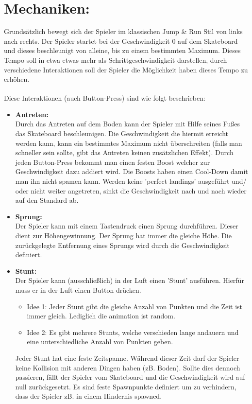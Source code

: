 \documentclass[paper=a4,fontsize=12pt,ngerman]{scrartcl}
\begin{document}
\section*{Mechaniken:}
Grundsätzlich bewegt sich der Spieler im klassischen Jump \& Run Stil von links nach rechts.
Der Spieler startet bei der Geschwindigkeit 0 auf dem Skateboard und dieses beschleunigt
von alleine, bis zu einem bestimmten Maximum.
Dieses Tempo soll in etwa etwas mehr als Schrittgeschwindigkeit darstellen, durch
verschiedene Interaktionen soll der Spieler die Möglichkeit haben dieses Tempo zu erhöhen.
\\ \\
Diese Interaktionen (auch Button-Press) sind wie folgt beschrieben:
\begin{itemize}
	\item \textbf{Antreten:} \\ Durch das Antreten auf dem Boden kann der Spieler mit Hilfe seines Fußes das Skateboard
	beschleunigen.
	Die Geschwindigkeit die hiermit erreicht werden kann, kann ein bestimmtes Maximum nicht
	überschreiten (falls man schneller sein sollte, gibt das Antreten keinen zusätzlichen Effekt).
	Durch jeden Button-Press bekommt man einen festen Boost welcher zur Geschwindigkeit
	dazu addiert wird. Die Boosts haben einen Cool-Down damit man ihn nicht spamen kann.
	Werden keine 'perfect landings' ausgeführt und/ oder nicht weiter angetreten, sinkt die
	Geschwindigkeit nach und nach wieder auf den Standard ab.
	
	\item \textbf{Sprung:} \\ Der Spieler kann mit einem Tastendruck einen Sprung durchführen. Dieser dient zur
	Höhengewinnung. Der Sprung hat immer die gleiche Höhe. Die zurückgelegte Entfernung
	eines Sprungs wird durch die Geschwindigkeit definiert.
	
	\item \textbf{Stunt:} \\ Der Spieler kann (ausschließlich) in der Luft einen 'Stunt' ausführen. Hierfür muss er in der
	Luft einen Button drücken.
	\begin{itemize}
		\item Idee 1: Jeder Stunt gibt die gleiche Anzahl von Punkten und die Zeit ist immer gleich.
		Lediglich die animation ist random.
		\item Idee 2: Es gibt mehrere Stunts, welche verschieden lange andauern und eine
		unterschiedliche Anzahl von Punkten geben.
	\end{itemize}
	Jeder Stunt hat eine feste Zeitspanne. Während dieser Zeit darf der Spieler keine Kollision
	mit anderen Dingen haben (zB. Boden). Sollte dies dennoch passieren, fällt der Spieler vom
	Skateboard und die Geschwindigkeit wird auf null zurückgesetzt.
	Es sind feste Spawnpunkte definiert um zu verhindern, dass der Spieler zB. in einem Hindernis spawned.
	

\end{itemize}
\end{document}
